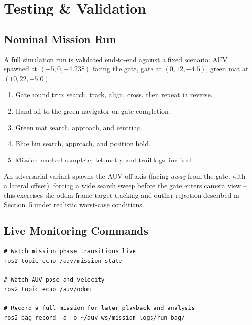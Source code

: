 \documentclass[11pt,a4paper]{article}
\begin{document}
\section{Testing \& Validation}

\subsection{Nominal Mission Run}

A full simulation run is validated end-to-end against a fixed scenario:
AUV spawned at $(-5, 0, -4.238)$ facing the gate, gate at $(0, 12, -4.5)$,
green mat at $(10, 22, -5.0)$.

\begin{enumerate}[leftmargin=1.6em,itemsep=1pt]
  \item Gate round trip: search, track, align, cross, then repeat in reverse.
  \item Hand-off to the green navigator on gate completion.
  \item Green mat search, approach, and centring.
  \item Blue bin search, approach, and position hold.
  \item Mission marked complete; telemetry and trail logs finalised.
\end{enumerate}

An adversarial variant spawns the AUV off-axis (facing \emph{away} from the
gate, with a lateral offset), forcing a wide search sweep before the gate
enters camera view -- this exercises the odom-frame target tracking and
outlier rejection described in Section~5 under realistic worst-case
conditions.

\subsection{Live Monitoring Commands}

\begin{lstlisting}[style=cleanbash, caption={Useful commands during a simulation run}]
# Watch mission phase transitions live
ros2 topic echo /auv/mission_state

# Watch AUV pose and velocity
ros2 topic echo /auv/odom

# Record a full mission for later playback and analysis
ros2 bag record -a -o ~/auv_ws/mission_logs/run_bag/
\end{lstlisting}

\end{document}
